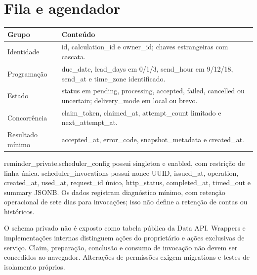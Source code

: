 \section{Fila e agendador}
\label{section-B-2}
\begin{quadro}[H]\centering
\caption{Campos operacionais de lembretes}
\label{quadro-5}
\begin{singlespace}\fontsize{10}{12}\selectfont
\begin{tabularx}{\linewidth}{|>{\raggedright\arraybackslash}X|>{\raggedright\arraybackslash}X|}
\hline
\textbf{Grupo} & \textbf{Conteúdo} \\
\hline
Identidade & id, calculation\_id e owner\_id; chaves estrangeiras com cascata. \\
\hline
Programação & due\_date, lead\_days em 0/1/3, send\_hour em 9/12/18, send\_at e time\_zone identificado. \\
\hline
Estado & status em pending, processing, accepted, failed, cancelled ou uncertain; delivery\_mode em local ou brevo. \\
\hline
Concorrência & claim\_token, claimed\_at, attempt\_count limitado e next\_attempt\_at. \\
\hline
Resultado mínimo & accepted\_at, error\_code, snapshot\_metadata e created\_at. \\
\hline
\end{tabularx}\end{singlespace}
\par{}
\end{quadro}
reminder\_private.scheduler\_config possui singleton e enabled, com restrição de linha única. scheduler\_invocations possui nonce UUID, issued\_at, operation, created\_at, used\_at, request\_id único, http\_status, completed\_at, timed\_out e summary JSONB. Os dados registram diagnóstico mínimo, com retenção operacional de sete dias para invocações; isso não define a retenção de contas ou históricos.

O schema privado não é exposto como tabela pública da Data API. Wrappers e implementações internas distinguem ações do proprietário e ações exclusivas de serviço. Claim, preparação, conclusão e consumo de invocação não devem ser concedidos ao navegador. Alterações de permissões exigem migrations e testes de isolamento próprios.

